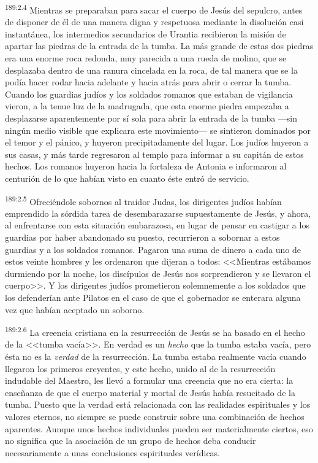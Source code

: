 \par 
\textsuperscript{189:2.4} Mientras se preparaban para sacar el cuerpo de Jesús del sepulcro, antes de disponer de él de una manera digna y respetuosa mediante la disolución casi instantánea, los intermedios secundarios de Urantia recibieron la misión de apartar las piedras de la entrada de la tumba. La más grande de estas dos piedras era una enorme roca redonda, muy parecida a una rueda de molino, que se desplazaba dentro de una ranura cincelada en la roca, de tal manera que se la podía hacer rodar hacia adelante y hacia atrás para abrir o cerrar la tumba. Cuando los guardias judíos y los soldados romanos que estaban de vigilancia vieron, a la tenue luz de la madrugada, que esta enorme piedra empezaba a desplazarse aparentemente por sí sola para abrir la entrada de la tumba ---sin ningún medio visible que explicara este movimiento--- se sintieron dominados por el temor y el pánico, y huyeron precipitadamente del lugar. Los judíos huyeron a sus casas, y más tarde regresaron al templo para informar a su capitán de estos hechos. Los romanos huyeron hacia la fortaleza de Antonia e informaron al centurión de lo que habían visto en cuanto éste entró de servicio.

\par 
\textsuperscript{189:2.5} Ofreciéndole sobornos al traidor Judas, los dirigentes judíos habían emprendido la sórdida tarea de desembarazarse supuestamente de Jesús, y ahora, al enfrentarse con esta situación embarazosa, en lugar de pensar en castigar a los guardias por haber abandonado su puesto, recurrieron a sobornar a estos guardias y a los soldados romanos. Pagaron una suma de dinero a cada uno de estos veinte hombres y les ordenaron que dijeran a todos: <<Mientras estábamos durmiendo por la noche, los discípulos de Jesús nos sorprendieron y se llevaron el cuerpo>>. Y los dirigentes judíos prometieron solemnemente a los soldados que los defenderían ante Pilatos en el caso de que el gobernador se enterara alguna vez que habían aceptado un soborno.

\par 
\textsuperscript{189:2.6} La creencia cristiana en la resurrección de Jesús se ha basado en el hecho de la <<tumba vacía>>. En verdad es un \textit{hecho} que la tumba estaba vacía, pero ésta no es la \textit{verdad} de la resurrección. La tumba estaba realmente vacía cuando llegaron los primeros creyentes, y este hecho, unido al de la resurrección indudable del Maestro, les llevó a formular una creencia que no era cierta: la enseñanza de que el cuerpo material y mortal de Jesús había resucitado de la tumba. Puesto que la verdad está relacionada con las realidades espirituales y los valores eternos, no siempre se puede construir sobre una combinación de hechos aparentes. Aunque unos hechos individuales pueden ser materialmente ciertos, eso no significa que la asociación de un grupo de hechos deba conducir necesariamente a unas conclusiones espirituales verídicas.

